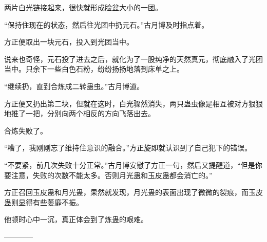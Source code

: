 \begin{this_body}
两片白光链接起来，很快就形成脸盆大小的一团。

“保持住现在的状态，然后往光团中扔元石。”古月博及时指点着。

方正便取出一块元石，投入到光团当中。

说来也奇怪，元石投了进去之后，就化为了一股纯净的天然真元，彻底融入了光团当中。只余下一些白色石粉，纷纷扬扬地落到床单之上。

“继续扔，直到合炼成二转蛊虫。”古月博道。

方正便又扔出第二块，但就在这时，白光骤然消失，两只蛊虫像是相互被对方狠狠地推了一把，分别向两个相反的方向飞落出去。

合炼失败了。

“糟了，我刚刚忘了维持住意识的融合。”方正旋即就认识到了自己犯下的错误。

“不要紧，前几次失败十分正常。”古月博安慰了方正一句，然后又提醒道，“但是你要注意，失败的次数不能太多。否则月光蛊和玉皮蛊都会消亡的。”

方正召回玉皮蛊和月光蛊，果然就发现，月光蛊的表面出现了微微的裂痕，而玉皮蛊则显得有些萎靡不振。

他顿时心中一沉，真正体会到了炼蛊的艰难。

------------

\end{this_body}

